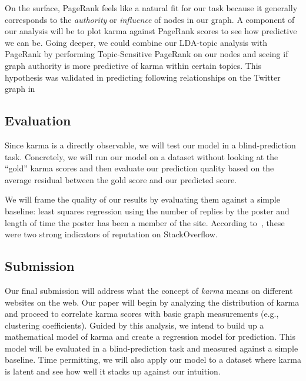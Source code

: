 \documentclass[10pt]{article}
\begin{document}
On the surface, PageRank feels like a natural fit for our task because it
generally corresponds to the \textit{authority} or \textit{influence} of nodes
in our graph. A component of our analysis will be to plot karma against PageRank
scores to see how predictive we can be.  Going deeper, we could combine our
LDA-topic analysis with PageRank by performing Topic-Sensitive PageRank
\citep{haveliwala2002topic} on our nodes and seeing if graph authority is more
predictive of karma within certain topics. This hypothesis was validated in
predicting following relationships on the Twitter graph in
\citet{weng2010twitterrank}

\subsection{Evaluation}
Since karma is a directly observable, we will test our model in a
blind-prediction task. Concretely, we will run our model on a dataset without
looking at the ``gold'' karma scores and then evaluate our prediction quality
based on the average residual between the gold score and our predicted score.

We will frame the quality of our results by evaluating them against a simple
baseline: least squares regression using the number of replies by the poster and
length of time the poster has been a member of the site. According
to~\citet{movshovitzanalysis}, these were two strong indicators of reputation on
StackOverflow. 

\subsection{Submission}

Our final submission will address what the concept of \textit{karma} means on
different websites on the web. Our paper will begin by analyzing the
distribution of karma and proceed to correlate karma scores with basic graph
measurements (e.g., clustering coefficients). Guided by this analysis, we intend
to build up a mathematical model of karma and create a regression model for
prediction. This model will be evaluated in a blind-prediction task and measured
against a simple baseline. Time permitting, we will also apply our
model to a dataset where karma is latent and see how well it stacks up
against our intuition.



\end{document}
